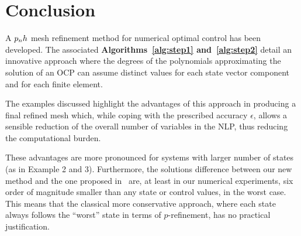 \section*{Conclusion}
A $p_{n}h$ mesh refinement method for numerical optimal control has been developed. The associated {\bf Algorithms~\ref{alg:step1} and~\ref{alg:step2}} detail an innovative approach where the degrees of the polynomials approximating the solution of an OCP can assume distinct values for each state vector component and for each finite element.

The examples discussed highlight the advantages of this approach in producing a final refined mesh which, while coping with the prescribed accuracy $\epsilon$, allows a sensible reduction of the overall number of variables in the NLP, thus reducing the computational burden.

These advantages are more pronounced for systems with larger number of states (as in Example 2 and 3).
Furthermore, the solutions difference between our new method and the one proposed in~\cite{Patterson:OCAM:2015} are, at least in our numerical experiments, six order of magnitude smaller than any state or control values, in the worst case. This means that the classical more conservative approach, where each state always follows the ``worst'' state in terms of $p$-refinement, has no practical justification.
